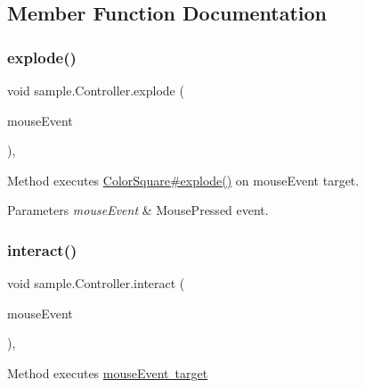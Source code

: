 \subsection{Member Function Documentation}
\mbox{\label{classsample_1_1_controller_a25b8717bc408df9520e1b12b57d49d71}} 
\subsubsection{\texorpdfstring{explode()}{explode()}}
{\footnotesize\ttfamily void sample.\+Controller.\+explode (\begin{DoxyParamCaption}\item[{Mouse\+Event}]{mouse\+Event }\end{DoxyParamCaption})\hspace{0.3cm}{\ttfamily [inline]}, {\ttfamily [private]}}

Method executes \mbox{\hyperlink{classsample_1_1_color_square_a7a9627028e034d129f9d408c89226aab}{Color\+Square\#explode()}} on mouse\+Event target.


\begin{DoxyParams}{Parameters}
{\em mouse\+Event} & Mouse\+Pressed event. \\
\hline
\end{DoxyParams}
\mbox{\label{classsample_1_1_controller_a2fc9e4d80a35b80d030359116c6c8ef5}} 
\subsubsection{\texorpdfstring{interact()}{interact()}}
{\footnotesize\ttfamily void sample.\+Controller.\+interact (\begin{DoxyParamCaption}\item[{Mouse\+Event}]{mouse\+Event }\end{DoxyParamCaption})\hspace{0.3cm}{\ttfamily [inline]}, {\ttfamily [private]}}

Method executes \mbox{\hyperlink{classsample_1_1_color_square_a268fbcc6abfcd0a2f74d94f067a9c2c7}{mouse\+Event target}}


